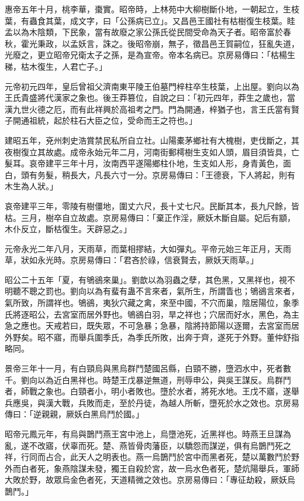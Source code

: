 \begin{pinyinscope}
惠帝五年十月，桃李華，棗實。昭帝時，上林苑中大柳樹斷仆地，一朝起立，生枝葉，有蟲食其葉，成文字，曰「公孫病已立」。又昌邑王國社有枯樹復生枝葉。眭孟以為木陰類，下民象，當有故廢之家公孫氏從民間受命為天子者。昭帝富於春秋，霍光秉政，以孟妖言，誅之。後昭帝崩，無子，徵昌邑王賀嗣位，狂亂失道，光廢之，更立昭帝兄衛太子之孫，是為宣帝。帝本名病已。京房易傳曰：「枯楊生稊，枯木復生，人君亡子。」

元帝初元四年，皇后曾祖父濟南東平陵王伯墓門梓柱卒生枝葉，上出屋。劉向以為王氏貴盛將代漢家之象也。後王莽篡位，自說之曰：「初元四年，莽生之歲也，當漢九世火德之厄，而有此祥興於高祖考之門。門為開通，梓猶子也，言王氏當有賢子開通祖統，起於柱石大臣之位，受命而王之符也。」

建昭五年，兗州刺史浩賞禁民私所自立社。山陽橐茅鄉社有大槐樹，吏伐斷之，其夜樹復立其故處。成帝永始元年二月，河南街郵樗樹生支如人頭，眉目須皆具，亡髮耳。哀帝建平三年十月，汝南西平遂陽鄉柱仆地，生支如人形，身青黃色，面白，頭有务髮，稍長大，凡長六寸一分。京房易傳曰：「王德衰，下人將起，則有木生為人狀。」

哀帝建平三年，零陵有樹僵地，圍丈六尺，長十丈七尺。民斷其本，長九尺餘，皆枯。三月，樹卒自立故處。京房易傳曰：「棄正作淫，厥妖木斷自屬。妃后有顓，木仆反立，斷枯復生。天辟惡之。」

元帝永光二年八月，天雨草，而葉相摎結，大如彈丸。平帝元始三年正月，天雨草，狀如永光時。京房易傳曰：「君吝於祿，信衰賢去，厥妖天雨草。」

昭公二十五年「夏，有鴝鵒來巢」。劉歆以為羽蟲之孽，其色黑，又黑祥也，視不明聽不聰之罰也。劉向以為有蜚有蛊不言來者，氣所生，所謂眚也；鴝鵒言來者，氣所致，所謂祥也。鴝鵒，夷狄穴藏之禽，來至中國，不穴而巢，陰居陽位，象季氏將逐昭公，去宮室而居外野也。鴝鵒白羽，旱之祥也；穴居而好水，黑色，為主急之應也。天戒若曰，既失眾，不可急暴；急暴，陰將持節陽以逐爾，去宮室而居外野矣。昭不寤，而舉兵圍季氏，為季氏所敗，出奔于齊，遂死于外野。董仲舒指略同。

景帝三年十一月，有白頸烏與黑烏群鬥楚國呂縣，白頸不勝，墮泗水中，死者數千。劉向以為近白黑祥也。時楚王戊暴逆無道，刑辱申公，與吳王謀反。烏群鬥者，師戰之象也。白頸者小，明小者敗也。墮於水者，將死水地。王戊不寤，遂舉兵應吳，與漢大戰，兵敗而走，至於丹徒，為越人所斬，墮死於水之效也。京房易傳曰：「逆親親，厥妖白黑烏鬥於國。」

昭帝元鳳元年，有烏與鵲鬥燕王宮中池上，烏墮池死，近黑祥也。時燕王旦謀為亂，遂不改寤，伏辜而死。楚、燕皆骨肉藩臣，以驕怨而謀逆，俱有烏鵲鬥死之祥，行同而占合，此天人之明表也。燕一烏鵲鬥於宮中而黑者死，楚以萬數鬥於野外而白者死，象燕陰謀未發，獨王自殺於宮，故一烏水色者死，楚炕陽舉兵，軍師大敗於野，故眾烏金色者死，天道精微之效也。京房易傳曰：「專征劫殺，厥妖烏鵲鬥。」


\end{pinyinscope}
